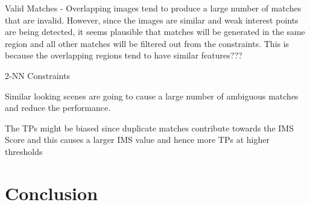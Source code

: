 \documentclass{report}
\begin{document}
Valid Matches - Overlapping images tend to produce a large number of matches that are invalid. However, since the images are similar and weak interest points are being detected, it seems plausible that matches will be generated in the same region and all other matches will be filtered out from the constraints. This is because the overlapping regions tend to have similar features???

2-NN Constraints

Similar looking scenes are going to cause a large number of ambiguous matches and reduce the performance.

The TPs might be biased since duplicate matches contribute towards the IMS Score and this causes a larger IMS value and hence more TPs at higher thresholds

\section{Conclusion}
\label{sec:conclusion}



%
%
 
\end{document}

